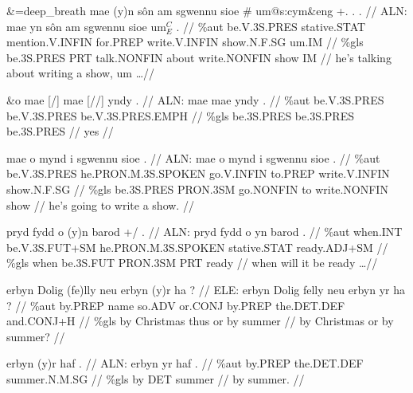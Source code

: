 \documentclass[a4paper,10pt]{article}
\begin{document}
\ex
\begingl[lingstyle=gergl]
\glchat \&=deep\_breath mae (y)n sôn am sgwennu sioe \# um@s:cym\&eng +. . . //
\glsurface ALN:  mae yn sôn am sgwennu sioe um$^{C}_{E}$ .  //
\glauto \%aut  be{\scriptsize .V.3S.PRES} stative{\scriptsize .STAT} mention{\scriptsize .V.INFIN} for{\scriptsize .PREP} write{\scriptsize .V.INFIN} show{\scriptsize .N.F.SG} um{\scriptsize .IM}   //
\glmanual \%gls  be{\scriptsize .3S.PRES} PRT talk{\scriptsize .NONFIN} about write{\scriptsize .NONFIN} show IM   //
\gleng he's talking about writing a show, um \dots  //
\endgl
\xe

\ex
\begingl[lingstyle=gergl]
\glchat \&o mae [/] mae [//] yndy . //
\glsurface ALN:  mae mae yndy .  //
\glauto \%aut  be{\scriptsize .V.3S.PRES} be{\scriptsize .V.3S.PRES} be{\scriptsize .V.3S.PRES.EMPH}   //
\glmanual \%gls  be{\scriptsize .3S.PRES} be{\scriptsize .3S.PRES} be{\scriptsize .3S.PRES}   //
\gleng yes //
\endgl
\xe

\ex
\begingl[lingstyle=gergl]
\glchat mae o mynd i sgwennu sioe . //
\glsurface ALN:  mae o mynd i sgwennu sioe .  //
\glauto \%aut  be{\scriptsize .V.3S.PRES} he{\scriptsize .PRON.M.3S.SPOKEN} go{\scriptsize .V.INFIN} to{\scriptsize .PREP} write{\scriptsize .V.INFIN} show{\scriptsize .N.F.SG}   //
\glmanual \%gls  be{\scriptsize .3S.PRES} PRON{\scriptsize .3SM} go{\scriptsize .NONFIN} to write{\scriptsize .NONFIN} show   //
\gleng he's going to write a show. //
\endgl
\xe

\ex
\begingl[lingstyle=gergl]
\glchat pryd fydd o (y)n barod +/ . //
\glsurface ALN:  pryd fydd o yn barod .  //
\glauto \%aut  when{\scriptsize .INT} be{\scriptsize .V.3S.FUT+SM} he{\scriptsize .PRON.M.3S.SPOKEN} stative{\scriptsize .STAT} ready{\scriptsize .ADJ+SM}   //
\glmanual \%gls  when be{\scriptsize .3S.FUT} PRON{\scriptsize .3SM} PRT ready   //
\gleng when will it be ready \dots  //
\endgl
\xe

\ex
\begingl[lingstyle=gergl]
\glchat erbyn Dolig (fe)lly neu erbyn (y)r ha ? //
\glsurface ELE:  erbyn Dolig felly neu erbyn yr ha ?  //
\glauto \%aut  by{\scriptsize .PREP} name so{\scriptsize .ADV} or{\scriptsize .CONJ} by{\scriptsize .PREP} the{\scriptsize .DET.DEF} and{\scriptsize .CONJ+H}   //
\glmanual \%gls  by Christmas thus or by summer    //
\gleng by Christmas or by summer? //
\endgl
\xe

\ex
\begingl[lingstyle=gergl]
\glchat erbyn (y)r haf . //
\glsurface ALN:  erbyn yr haf .  //
\glauto \%aut  by{\scriptsize .PREP} the{\scriptsize .DET.DEF} summer{\scriptsize .N.M.SG}   //
\glmanual \%gls  by DET summer   //
\gleng by summer. //
\endgl
\xe
\end{document}
